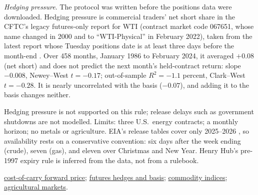 \begin{qfdefinition}
\emph{Hedging pressure}. The protocol was written before the positions data were downloaded. Hedging pressure is commercial traders' net short share in the CFTC's legacy futures-only report for WTI (contract market code 067651, whose name changed in 2000 and to ``WTI-Physical'' in February 2022), taken from the latest report whose Tuesday positions date is at least three days before the month-end \citep[legacy futures-only historical files, 1986--2024]{cftc-cot-history}. Over 458 months, January 1986 to February 2024, it averaged $+0.08$ (net short) and does not predict the next month's held-contract return: slope $-0.008$, Newey--West $t=-0.17$; out-of-sample $R^2=-1.1$ percent, Clark--West $t=-0.28$. It is nearly uncorrelated with the basis ($-0.07$), and adding it to the basis changes neither.

Hedging pressure is not supported on this rule; release delays such as government shutdowns are not modelled. Limits: three U.S.\ energy contracts; a monthly horizon; no metals or agriculture. EIA's release tables cover only 2025--2026 \citep[holiday tables]{eia-weekly-release-schedules}, so availability rests on a conservative convention: six days after the week ending (crude), seven (gas), and eleven over Christmas and New Year. Henry Hub's pre-1997 expiry rule is inferred from the data, not from a rulebook.

 \hyperref[res:cost-of-carry-forward-price]{cost-of-carry forward price}; \hyperref[def:futures-hedge-basis]{futures hedges and basis}; \hyperref[def:commodity-indices-risk-return]{commodity indices}; \hyperref[def:agricultural-markets]{agricultural markets}.


\end{qfdefinition}
